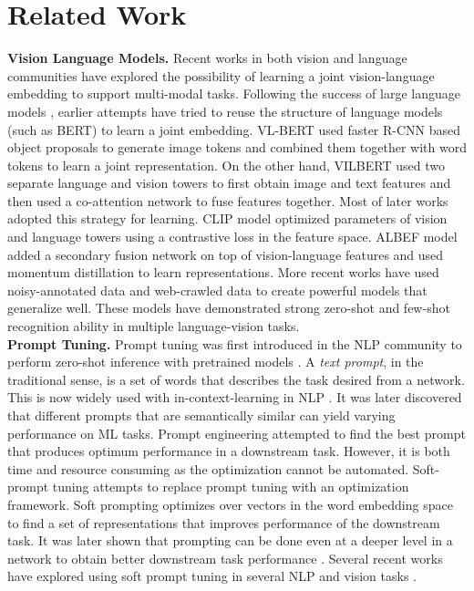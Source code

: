 \documentclass[10pt,twocolumn,letterpaper]{article}
\begin{document}
\section{Related Work}

    \noindent \textbf{Vision Language Models.} Recent works in both vision and language communities have explored the possibility of learning a joint vision-language embedding to support multi-modal tasks. Following the success of large language models \cite{bert,roberta,gpt}, earlier attempts have tried to reuse the structure of language models (such as BERT) to learn a joint embedding. VL-BERT\cite{vlbert} used faster R-CNN based object proposals to generate image tokens and combined them together with word tokens to learn a joint representation. On the other hand, VILBERT \cite{vilbert} used two separate language and vision towers to first obtain image and text features and then used a co-attention network to fuse features together. Most of later works adopted this strategy for learning.  CLIP \cite{clip} model optimized parameters of vision and language towers using a contrastive loss in the feature space. ALBEF model \cite{albef} added a secondary fusion network on top of vision-language features and used momentum distillation to learn representations. More recent works have used noisy-annotated data\cite{clip} and web-crawled data \cite{flamingo} to create powerful models that generalize well. These models have demonstrated strong zero-shot and few-shot recognition ability in multiple language-vision tasks\cite{clip, flamingo, align}.\\
    \noindent \textbf{Prompt Tuning.} Prompt tuning was first introduced in the NLP community to perform zero-shot inference with pretrained models . A \textit{text prompt}, in the traditional sense, is a set of words that describes the task desired from a network. This is now widely used with in-context-learning in NLP \cite{gpt3, palm}. It was later discovered that different prompts that are semantically similar can yield varying performance on ML tasks. Prompt engineering attempted to find the best prompt that produces optimum performance in a downstream task. However, it is both time and resource consuming as the optimization cannot be automated. Soft-prompt tuning \cite{liu-etal-2022-p,  xianglisaliprefixtuning,sprompt} attempts to replace prompt tuning with an optimization framework. Soft prompting optimizes over vectors in the word embedding space to find a set of representations that improves performance of the downstream task. It was later shown that prompting can be done even at a deeper level in a network to obtain better downstream task performance \cite{liupretrainprompt}. Several recent works have explored using soft prompt tuning in several NLP and vision tasks \cite{visualprompttuning}.\\
\end{document}
